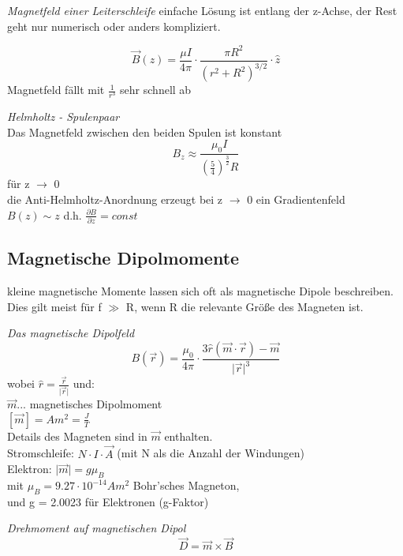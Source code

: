 \documentclass[a4paper,12pt]{report}
\begin{document}
\emph{Magnetfeld einer Leiterschleife}
einfache Lösung ist entlang der z-Achse, der Rest geht nur numerisch oder anders kompliziert.

\begin{equation}
\vec{B}(z) = \frac{\mu I }{4\pi} \cdot \frac{\pi R^2}{(r^2 + R^2)^{3/2}} \cdot \hat{z}
\end{equation}
Magnetfeld fällt mit $ \frac{1}{r^3} $ sehr schnell ab

\emph{Helmholtz - Spulenpaar}\\
Das Magnetfeld zwischen den beiden Spulen ist konstant
\begin{equation}
B_z \approx \frac{\mu_0 I}{(\frac{5}{4})^{\frac{3}{2}}R} 
\end{equation}für z $\rightarrow $ 0\\

die Anti-Helmholtz-Anordnung erzeugt bei z $\rightarrow$ 0 ein Gradientenfeld\\
$ B(z) \sim z $ d.h. $\frac{\partial{B}}{\partial z}  = const$

\subsection{Magnetische Dipolmomente}
kleine magnetische Momente lassen sich oft als magnetische Dipole beschreiben.\\
Dies gilt meist für f $\gg$ R, wenn R die relevante Größe des Magneten ist.

\emph{Das magnetische Dipolfeld}
\begin{equation}
B(\vec{r}) = \frac{\mu_0}{4\pi}\cdot \frac{3\hat{r}(\vec{m}\cdot\vec{r})-\vec{m}}{\bigl|\vec{r}\bigl|^3}
\end{equation}
wobei $ \hat{r} = \frac{\vec{r}}{\bigl|\vec{r}\bigl|}$ und:\\
$ \vec{m} $... magnetisches Dipolmoment\\
$[\vec{m}] = Am^2 = \frac{J}{T} $\\
Details des Magneten sind in $\vec{m}$ enthalten.\\

Stromschleife: $ N\cdot I\cdot \vec{A} $ (mit N als die Anzahl der Windungen)\\
Elektron: $ \bigl|\vec{m}\bigl| = g \mu_B$  \\mit $\mu_B = 9.27\cdot10^{-14} Am^2 $ Bohr'sches Magneton, \\und g = 2.0023 für Elektronen (g-Faktor)

\emph{Drehmoment auf magnetischen Dipol}
\begin{equation}
\vec{D} = \vec{m} \times \vec{B}
\end{equation}
\end{document}
